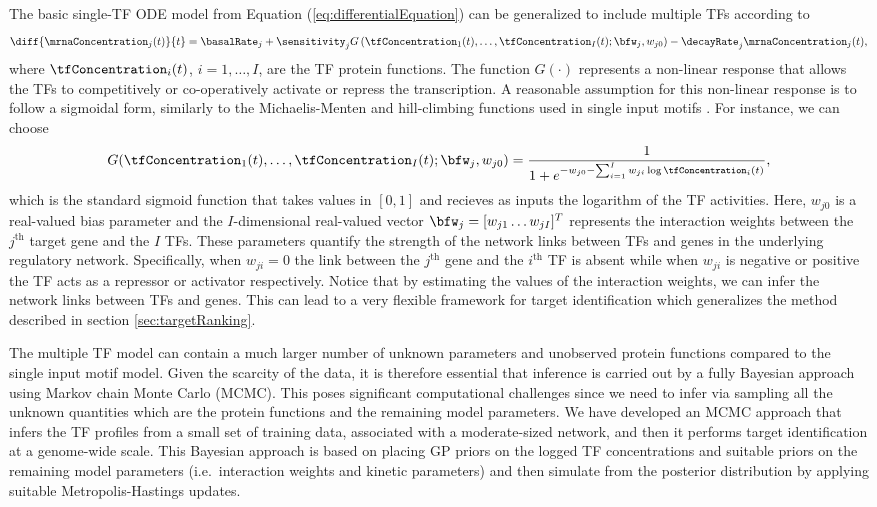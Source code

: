 \documentclass{article}
\begin{document}
The basic single-TF ODE model from Equation 
(\ref{eq:differentialEquation}) can be generalized
to include multiple TFs according to  
\begin{equation}
\diff{\mrnaConcentration_j(t)}{t} = \basalRate_j + 
\sensitivity_j G
\left(\tfConcentration_1(t),\ldots,\tfConcentration_I(t);
  \bfw_j, w_{j0}\right) -\decayRate_j \mrnaConcentration_j(t), \label{eq:multipleTFtranscription}
\end{equation}
where $\tfConcentration_i(t)$, $i=1,\ldots,I$, are the TF protein functions.
The function $G(\cdot)$ represents a non-linear response
that allows the TFs to competitively or co-operatively activate 
or repress the transcription. A reasonable 
assumption for this non-linear response is 
to follow a sigmoidal form, similarly to the Michaelis-Menten
and hill-climbing functions used in single input motifs 
\citep{Alon:systems06}. For instance, we can choose   
\begin{equation} 
G(\tfConcentration_1(t),\ldots,\tfConcentration_I(t); \bfw_j, w_{j0})
= \frac{1}{1 + e^{-w_{j0}  - \sum_{i=1}^I w_{ji} \log \tfConcentration_i(t)}},
\label{eq:multipleTFhillFun}
\end{equation}
which is the standard sigmoid function that takes values in 
$[0,1]$ and recieves as inputs the logarithm of the TF activities. 
Here, $w_{j0}$ is a real-valued bias parameter and
the $I$-dimensional real-valued vector 
$\bfw_j = [w_{j1} \ldots w_{jI}]^T$ represents the
interaction weights between the $j^{\text{th}}$ target gene and the
$I$ TFs. These parameters quantify the strength 
of the network links between TFs and genes in 
the underlying regulatory network.
Specifically, when $w_{ji}=0$ the link between the $j^{\text{th}}$ gene 
and the $i^{\text{th}}$ TF is absent while when $w_{ji}$
is negative or positive the TF acts as a repressor or activator respectively.
Notice that by estimating the values of the interaction weights, we can infer the network links between 
TFs and genes. This can lead to a very flexible
framework for target identification which generalizes the 
method described in section \ref{sec:targetRanking}.

The multiple TF model can contain a much larger number 
of unknown parameters and unobserved protein functions
compared to the single input motif model. Given the scarcity 
of the data, it is therefore essential 
that inference is carried out by a fully Bayesian approach using
Markov chain Monte Carlo (MCMC).
This poses significant computational challenges 
since we need to infer via sampling all the unknown quantities which 
are the protein functions and the remaining model parameters. 
We have developed an MCMC approach 
that infers the TF profiles from a small set of training data, associated with a moderate-sized network, 
and then it performs target identification at a genome-wide scale. 
This Bayesian approach is based on placing 
GP priors on the logged TF concentrations and suitable priors on the
remaining model parameters (i.e.\ interaction weights and kinetic parameters) 
and then simulate from the posterior distribution  
by applying suitable Metropolis-Hastings updates.     
\end{document}
